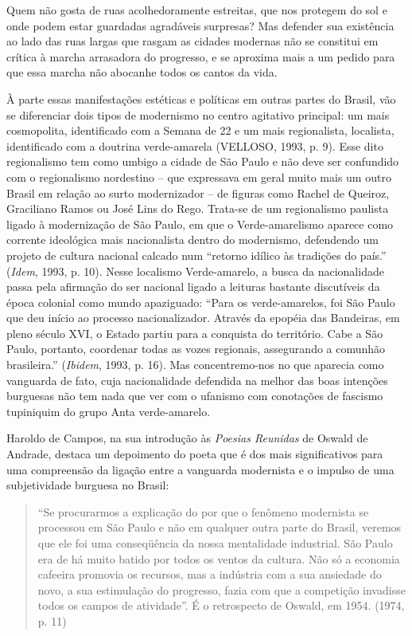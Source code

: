 Quem não gosta de ruas acolhedoramente estreitas, que nos protegem do
sol e onde podem estar guardadas agradáveis surpresas? Mas defender sua
existência ao lado das ruas largas que rasgam as cidades modernas não se
constitui em crítica à marcha arrasadora do progresso, e se aproxima
mais a um pedido para que essa marcha não abocanhe todos os cantos da
vida.

À parte essas manifestações estéticas e políticas em outras partes do
Brasil, vão se diferenciar dois tipos de modernismo no centro agitativo
principal: um mais cosmopolita, identificado com a Semana de 22 e um
mais regionalista, localista, identificado com a doutrina verde-amarela
(VELLOSO, 1993, p. 9). Esse dito regionalismo tem como umbigo a cidade
de São Paulo e não deve ser confundido com o regionalismo nordestino --
que expressava em geral muito mais um outro Brasil em relação ao surto
modernizador -- de figuras como Rachel de Queiroz, Graciliano Ramos ou
José Lins do Rego. Trata-se de um regionalismo paulista ligado à
modernização de São Paulo, em que o Verde-amarelismo aparece como
corrente ideológica mais nacionalista dentro do modernismo, defendendo
um projeto de cultura nacional calcado num ``retorno idílico às
tradições do país.'' (\emph{Idem}, 1993, p. 10). Nesse localismo
Verde-amarelo, a busca da nacionalidade passa pela afirmação do ser
nacional ligado a leituras bastante discutíveis da época colonial como
mundo apaziguado: ``Para os verde-amarelos, foi São Paulo que deu início
ao processo nacionalizador. Através da epopéia das Bandeiras, em pleno
século XVI, o Estado partiu para a conquista do território. Cabe a São
Paulo, portanto, coordenar todas as vozes regionais, assegurando a
comunhão brasileira.'' (\emph{Ibidem}, 1993, p. 16). Mas concentremo-nos
no que aparecia como vanguarda de fato, cuja nacionalidade defendida na
melhor das boas intenções burguesas não tem nada que ver com o ufanismo
com conotações de fascismo tupiniquim do grupo Anta verde-amarelo.

Haroldo de Campos, na sua introdução às \emph{Poesias Reunidas} de
Oswald de Andrade, destaca um depoimento do poeta que é dos mais
significativos para uma compreensão da ligação entre a vanguarda
modernista e o impulso de uma subjetividade burguesa no Brasil:

\begin{quote}
``Se procurarmos a explicação do por que o fenômeno modernista se
processou em São Paulo e não em qualquer outra parte do Brasil, veremos
que ele foi uma conseqüência da nossa mentalidade industrial. São Paulo
era de há muito batido por todos os ventos da cultura. Não só a economia
cafeeira promovia os recursos, mas a indústria com a sua ansiedade do
novo, a sua estimulação do progresso, fazia com que a competição
invadisse todos os campos de atividade''. É o retrospecto de Oswald, em
1954. (1974, p. 11)
\end{quote}

